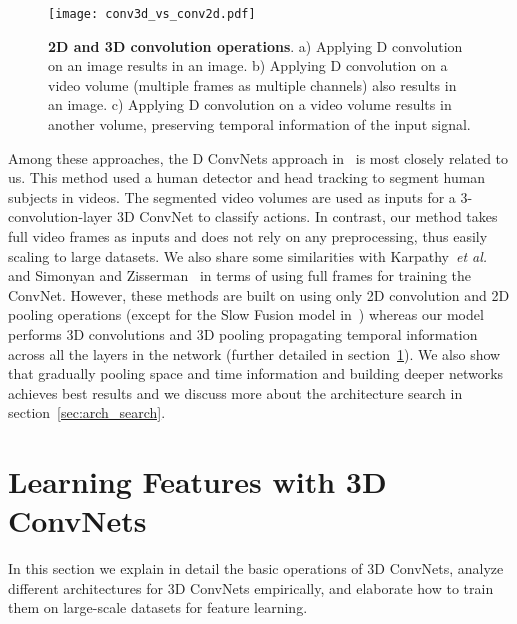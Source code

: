 \documentclass[10pt,twocolumn,letterpaper]{article}
\begin{document}
\begin{figure*}[t]
\begin{center}
   \texttt{[image: conv3d\_vs\_conv2d.pdf]}
\end{center}
\vspace{-12pt}
   \caption{{\bf 2D and 3D convolution operations}. a) Applying D convolution on an image results in an image. b) Applying D convolution on a video volume (multiple frames as multiple channels) also results in an image. c) Applying D convolution on a video volume results in another volume, preserving temporal information of the input signal.}
\label{fig:conv3d_vs_conv2d}
\vspace{-12pt}
\end{figure*}


Among these approaches, the D ConvNets approach in~\cite{Ming2013} is most closely related to us. This method used a human detector and head tracking to segment human subjects in videos. The segmented video volumes are used as inputs for a 3-convolution-layer 3D ConvNet to classify actions. In contrast, our method takes full video frames as inputs and does not rely on any preprocessing, thus easily scaling to large datasets. We also share some similarities with Karpathy~\emph{et al.}~\cite{Karpathy14} and Simonyan and Zisserman~\cite{SimonyanZ14} in terms of using full frames for training the ConvNet. However, these methods are built on using only 2D convolution and 2D pooling operations (except for the Slow Fusion model in~\cite{Karpathy14}) whereas our model performs 3D convolutions and 3D pooling propagating temporal information across all the layers in the network (further detailed in section~\ref{sec:learning_features}). We also show that gradually pooling space and time information and building deeper networks achieves best results and we discuss more about the architecture search in section~\ref{sec:arch_search}. 

\section{Learning Features with 3D ConvNets}
\label{sec:learning_features}
In this section we explain in detail the basic operations of 3D ConvNets, analyze different architectures for 3D ConvNets empirically, and elaborate how to train them on large-scale datasets for feature learning. 
\end{document}
